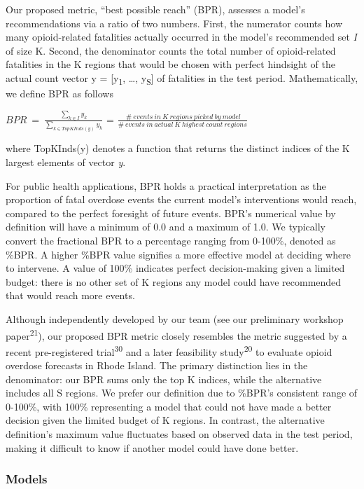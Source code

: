 Our proposed metric, ``best possible reach'' (BPR), assesses a model's recommendations via a ratio of two numbers. First, the numerator counts how many opioid-related fatalities actually occurred in the model's recommended set \emph{I} of size K. Second, the denominator counts the total number of opioid-related fatalities in the K regions that would be chosen with perfect hindsight of the actual count vector y = {[}y\textsubscript{1}, \ldots, y\textsubscript{S}{]} of fatalities in the test period. Mathematically, we define BPR as follows

\(BPR\  = \ \frac{\sum_{k \in I}^{}y_{k}}{\sum_{k \in TopKInds(y)}^{}y_{k}}\) = \(\frac{\ \#\ events\ in\ K\ regions\ picked\ by\ model}{\#\ events\ in\ actual\ K\ highest\ count\ regions}\)

where TopKInds(y) denotes a function that returns the distinct indices of the K largest elements of vector \emph{y}.

For public health applications, BPR holds a practical interpretation as the proportion of fatal overdose events the current model's interventions would reach, compared to the perfect foresight of future events. BPR's numerical value by definition will have a minimum of 0.0 and a maximum of 1.0. We typically convert the fractional BPR to a percentage ranging from 0-100\%, denoted as \%BPR. A higher \%BPR value signifies a more effective model at deciding where to intervene. A value of 100\% indicates perfect decision-making given a limited budget: there is no other set of K regions any model could have recommended that would reach more events.

Although independently developed by our team (see our preliminary workshop paper\textsuperscript{21}), our proposed BPR metric closely resembles the metric suggested by a recent pre-registered trial\textsuperscript{30} and a later feasibility study\textsuperscript{20} to evaluate opioid overdose forecasts in Rhode Island. The primary distinction lies in the denominator: our BPR sums only the top K indices, while the alternative includes all S regions. We prefer our definition due to \%BPR's consistent range of 0-100\%, with 100\% representing a model that could not have made a better decision given the limited budget of K regions. In contrast, the alternative definition's maximum value fluctuates based on observed data in the test period, making it difficult to know if another model could have done better.

\subsubsection{Models}\label{models}

